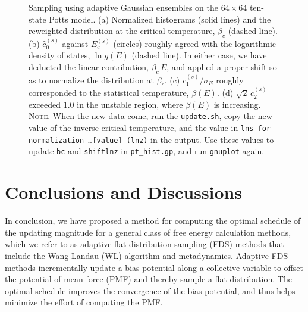 \documentclass[reprint, superscriptaddress, floatfix]{revtex4-1}
\newcommand{\note}[1]{{\color{DarkGreen}\footnotesize \textsc{Note.} #1}}
\begin{document}
\begin{figure}[h]\centering
  \caption{
    \label{fig:pt_hist}
    Sampling using adaptive Gaussian ensembles
    on the $64 \times 64$ ten-state Potts model.
    (a) Normalized histograms (solid lines)
    and the reweighted distribution
    at the critical temperature, $\beta_c$ (dashed line).
    (b) $\hat c_0^{(s)}$ against $E_c^{(s)}$ (circles)
    roughly agreed with the logarithmic density of states,
    $\ln g(E)$ (dashed line).
    In either case,
    we have deducted the linear contribution, $\beta_c \, E$,
    and applied a proper shift so as to normalize
    the distribution at $\beta_c$.
    (c) $c_1^{(s)}/\sigma_E$ roughly corresponded to
    the statistical temperature, $\beta(E)$.
    (d) $\sqrt 2 \, c_2^{(s)}$
    exceeded $1.0$ in the unstable region,
    where $\beta(E)$ is increasing.
    \note{When the new data come,
    run the \texttt{update.sh},
    copy the new value of the inverse critical temperature,
    and the value in \texttt{lns for normalization \dots [value] (lnz)}
    in the output.
    Use these values to update \texttt{bc} and \texttt{shiftlnz}
    in \texttt{pt\_hist.gp}, and run \texttt{gnuplot} again.  }%
  }
\end{figure}


\section{\label{sec:conclusion}
Conclusions and Discussions}



In conclusion,
we have proposed a method for computing
the optimal schedule of the updating magnitude
for a general class of free energy calculation methods,
which we refer to as adaptive flat-distribution-sampling (FDS) methods
that include the Wang-Landau (WL) algorithm and metadynamics.
%
Adaptive FDS methods
incrementally update a bias potential
along a collective variable
to offset the potential of mean force (PMF)
and thereby sample a flat distribution.
%
The optimal schedule improves the convergence
of the bias potential,
and thus helps minimize the effort
of computing the PMF.
\end{document}

